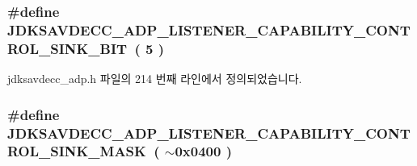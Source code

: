\subsubsection[{\texorpdfstring{J\+D\+K\+S\+A\+V\+D\+E\+C\+C\+\_\+\+A\+D\+P\+\_\+\+L\+I\+S\+T\+E\+N\+E\+R\+\_\+\+C\+A\+P\+A\+B\+I\+L\+I\+T\+Y\+\_\+\+C\+O\+N\+T\+R\+O\+L\+\_\+\+S\+I\+N\+K\+\_\+\+B\+IT}{JDKSAVDECC_ADP_LISTENER_CAPABILITY_CONTROL_SINK_BIT}}]{\setlength{\rightskip}{0pt plus 5cm}\#define J\+D\+K\+S\+A\+V\+D\+E\+C\+C\+\_\+\+A\+D\+P\+\_\+\+L\+I\+S\+T\+E\+N\+E\+R\+\_\+\+C\+A\+P\+A\+B\+I\+L\+I\+T\+Y\+\_\+\+C\+O\+N\+T\+R\+O\+L\+\_\+\+S\+I\+N\+K\+\_\+\+B\+IT~( 5 )}\hypertarget{group__adp__listener__capability_ga193e4ecba3b72a6a792b3e490b0773c0}{}\label{group__adp__listener__capability_ga193e4ecba3b72a6a792b3e490b0773c0}


jdksavdecc\+\_\+adp.\+h 파일의 214 번째 라인에서 정의되었습니다.

\subsubsection[{\texorpdfstring{J\+D\+K\+S\+A\+V\+D\+E\+C\+C\+\_\+\+A\+D\+P\+\_\+\+L\+I\+S\+T\+E\+N\+E\+R\+\_\+\+C\+A\+P\+A\+B\+I\+L\+I\+T\+Y\+\_\+\+C\+O\+N\+T\+R\+O\+L\+\_\+\+S\+I\+N\+K\+\_\+\+M\+A\+SK}{JDKSAVDECC_ADP_LISTENER_CAPABILITY_CONTROL_SINK_MASK}}]{\setlength{\rightskip}{0pt plus 5cm}\#define J\+D\+K\+S\+A\+V\+D\+E\+C\+C\+\_\+\+A\+D\+P\+\_\+\+L\+I\+S\+T\+E\+N\+E\+R\+\_\+\+C\+A\+P\+A\+B\+I\+L\+I\+T\+Y\+\_\+\+C\+O\+N\+T\+R\+O\+L\+\_\+\+S\+I\+N\+K\+\_\+\+M\+A\+SK~( $\sim$0x0400 )}\hypertarget{group__adp__listener__capability_ga17b31b0f0007ea6ded9b8b838f4ef289}{}\label{group__adp__listener__capability_ga17b31b0f0007ea6ded9b8b838f4ef289}


